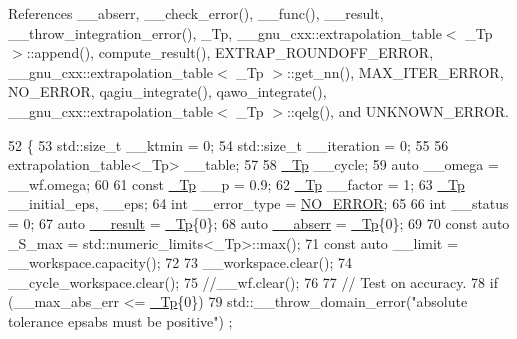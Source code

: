 References \+\_\+\+\_\+abserr, \+\_\+\+\_\+check\+\_\+error(), \+\_\+\+\_\+func(), \+\_\+\+\_\+result, \+\_\+\+\_\+throw\+\_\+integration\+\_\+error(), \+\_\+\+Tp, \+\_\+\+\_\+gnu\+\_\+cxx\+::extrapolation\+\_\+table$<$ \+\_\+\+Tp $>$\+::append(), compute\+\_\+result(), E\+X\+T\+R\+A\+P\+\_\+\+R\+O\+U\+N\+D\+O\+F\+F\+\_\+\+E\+R\+R\+OR, \+\_\+\+\_\+gnu\+\_\+cxx\+::extrapolation\+\_\+table$<$ \+\_\+\+Tp $>$\+::get\+\_\+nn(), M\+A\+X\+\_\+\+I\+T\+E\+R\+\_\+\+E\+R\+R\+OR, N\+O\+\_\+\+E\+R\+R\+OR, qagiu\+\_\+integrate(), qawo\+\_\+integrate(), \+\_\+\+\_\+gnu\+\_\+cxx\+::extrapolation\+\_\+table$<$ \+\_\+\+Tp $>$\+::qelg(), and U\+N\+K\+N\+O\+W\+N\+\_\+\+E\+R\+R\+OR.


\begin{DoxyCode}
52     \{
53       std::size\_t \_\_ktmin = 0;
54       std::size\_t \_\_iteration = 0;
55 
56       extrapolation\_table<\_Tp> \_\_table;
57 
58       \hyperlink{namespace____gnu__cxx_a3b19a9c800ca194374ef9172290f7d79}{\_Tp} \_\_cycle;
59       \textcolor{keyword}{auto} \_\_omega = \_\_wf.omega;
60 
61       \textcolor{keyword}{const} \hyperlink{namespace____gnu__cxx_a3b19a9c800ca194374ef9172290f7d79}{\_Tp} \_\_p = 0.9;
62       \hyperlink{namespace____gnu__cxx_a3b19a9c800ca194374ef9172290f7d79}{\_Tp} \_\_factor = 1;
63       \hyperlink{namespace____gnu__cxx_a3b19a9c800ca194374ef9172290f7d79}{\_Tp} \_\_initial\_eps, \_\_eps;
64       \textcolor{keywordtype}{int} \_\_error\_type = \hyperlink{namespace____gnu__cxx_ad6c62dd86a596716cece6ac2d4cfd4b3ac31eecc280b10dec2efb4a2216ccc2e0}{NO\_ERROR};
65 
66       \textcolor{keywordtype}{int} \_\_status = 0;
67       \textcolor{keyword}{auto} \hyperlink{namespace____gnu__cxx_a500ea9f53aeaecd8c2ae657503450578}{\_\_result} = \hyperlink{namespace____gnu__cxx_a3b19a9c800ca194374ef9172290f7d79}{\_Tp}\{0\};
68       \textcolor{keyword}{auto} \hyperlink{namespace____gnu__cxx_a72f736cff127f1574e91a301de9e074b}{\_\_abserr} = \hyperlink{namespace____gnu__cxx_a3b19a9c800ca194374ef9172290f7d79}{\_Tp}\{0\};
69 
70       \textcolor{keyword}{const} \textcolor{keyword}{auto} \_S\_max = std::numeric\_limits<\_Tp>::max();
71       \textcolor{keyword}{const} \textcolor{keyword}{auto} \_\_limit = \_\_workspace.capacity();
72 
73       \_\_workspace.clear();
74       \_\_cycle\_workspace.clear();
75       \textcolor{comment}{//\_\_wf.clear();}
76 
77       \textcolor{comment}{// Test on accuracy.}
78       \textcolor{keywordflow}{if} (\_\_max\_abs\_err <= \hyperlink{namespace____gnu__cxx_a3b19a9c800ca194374ef9172290f7d79}{\_Tp}\{0\})
79         std::\_\_throw\_domain\_error(\textcolor{stringliteral}{"absolute tolerance epsabs must be positive"}) ;

\end{DoxyCode}
